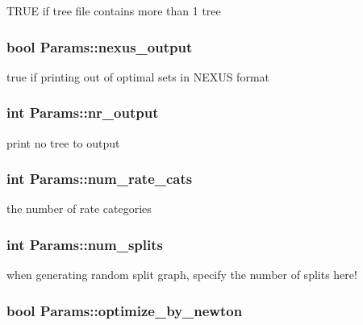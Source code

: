 \label{structParams_a3d87d2c85fac27e211f2877ba5f48d76}
TRUE if tree file contains more than 1 tree \hypertarget{structParams_a91030c2a58bbf5c53f91c2d14dcae7c1}{
\subsubsection[{nexus\_\-output}]{\setlength{\rightskip}{0pt plus 5cm}bool {\bf Params::nexus\_\-output}}}
\label{structParams_a91030c2a58bbf5c53f91c2d14dcae7c1}
true if printing out of optimal sets in NEXUS format \hypertarget{structParams_a0a642b128382191a7b873cff928bcbdc}{
\subsubsection[{nr\_\-output}]{\setlength{\rightskip}{0pt plus 5cm}int {\bf Params::nr\_\-output}}}
\label{structParams_a0a642b128382191a7b873cff928bcbdc}
print no tree to output \hypertarget{structParams_aa3139383f4a928160f768f084fa09771}{
\subsubsection[{num\_\-rate\_\-cats}]{\setlength{\rightskip}{0pt plus 5cm}int {\bf Params::num\_\-rate\_\-cats}}}
\label{structParams_aa3139383f4a928160f768f084fa09771}
the number of rate categories \hypertarget{structParams_a90484230e2806a900defa3d2f1de0fa5}{
\subsubsection[{num\_\-splits}]{\setlength{\rightskip}{0pt plus 5cm}int {\bf Params::num\_\-splits}}}
\label{structParams_a90484230e2806a900defa3d2f1de0fa5}
when generating random split graph, specify the number of splits here! \hypertarget{structParams_acd0efde7ff44948e3193e1e248866e8b}{
\subsubsection[{optimize\_\-by\_\-newton}]{\setlength{\rightskip}{0pt plus 5cm}bool {\bf Params::optimize\_\-by\_\-newton}}}
